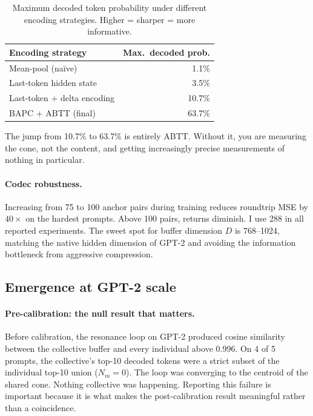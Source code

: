 \documentclass[10pt,twocolumn]{article}
\begin{document}
\begin{table}[h]
\centering
\caption{Maximum decoded token probability under different encoding strategies. Higher = sharper = more informative.}
\label{tab:blurring}
\small
\begin{tabular}{lr}
\toprule
Encoding strategy & Max.\ decoded prob. \\
\midrule
Mean-pool (na\"ive)          & 1.1\% \\
Last-token hidden state      & 3.5\% \\
Last-token + delta encoding  & 10.7\% \\
BAPC + ABTT (final)          & 63.7\% \\
\bottomrule
\end{tabular}
\end{table}

The jump from 10.7\% to 63.7\% is entirely ABTT. Without it, you are measuring the cone, not the content, and getting increasingly precise measurements of nothing in particular.

\paragraph{Codec robustness.}
Increasing from 75 to 100 anchor pairs during training reduces roundtrip MSE by $40\times$ on the hardest prompts. Above 100 pairs, returns diminish. I use 288 in all reported experiments. The sweet spot for buffer dimension $D$ is 768--1024, matching the native hidden dimension of GPT-2 and avoiding the information bottleneck from aggressive compression.

\subsection{Emergence at GPT-2 scale}
\label{sec:gpt2emergence}

\paragraph{Pre-calibration: the null result that matters.}
Before calibration, the resonance loop on GPT-2 produced cosine similarity between the collective buffer and every individual above 0.996. On 4 of 5 prompts, the collective's top-10 decoded tokens were a strict subset of the individual top-10 union ($N_m = 0$). The loop was converging to the centroid of the shared cone. Nothing collective was happening. Reporting this failure is important because it is what makes the post-calibration result meaningful rather than a coincidence.
\end{document}
